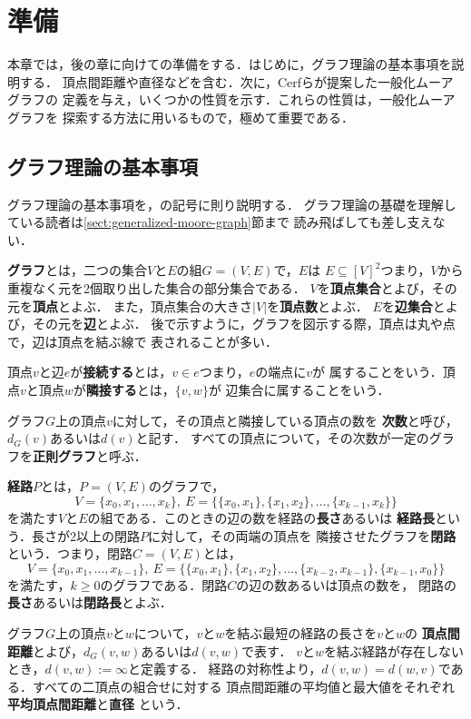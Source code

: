 
\chapter{準備}
\label{chap:preliminary}
本章では，後の章に向けての準備をする．はじめに，グラフ理論の基本事項を説明する．
頂点間距離や直径などを含む．次に，Cerfらが提案した一般化ムーアグラフの
定義を与え，いくつかの性質を示す．これらの性質は，一般化ムーアグラフを
探索する方法に用いるもので，極めて重要である．

\section{グラフ理論の基本事項}
\label{sect:basic-graph-theory}
グラフ理論の基本事項を，\cite{Diestel2000}の記号に則り説明する．
グラフ理論の基礎を理解している読者は\ref{sect:generalized-moore-graph}節まで
読み飛ばしても差し支えない．

\textbf{グラフ}とは，二つの集合$V$と$E$の組$G=(V,E)$で，$E$は
$E\subseteq[V]^2$つまり，$V$から重複なく元を2個取り出した集合の部分集合である．
$V$を\textbf{頂点集合}とよび，その元を\textbf{頂点}とよぶ．
また，頂点集合の大きさ$|V|$を\textbf{頂点数}とよぶ．
$E$を\textbf{辺集合}とよび，その元を\textbf{辺}とよぶ．
後で示すように，グラフを図示する際，頂点は丸や点で，辺は頂点を結ぶ線で
表されることが多い．

頂点$v$と辺$e$が\textbf{接続する}とは，$v\in e$つまり，$e$の端点に$v$が
属することをいう．頂点$v$と頂点$w$が\textbf{隣接する}とは，$\{v,w\}$が
辺集合に属することをいう．

グラフ$G$上の頂点$v$に対して，その頂点と隣接している頂点の数を
\textbf{次数}と呼び，$d_G(v)$あるいは$d(v)$と記す．
すべての頂点について，その次数が一定のグラフを\textbf{正則グラフ}と呼ぶ．

\textbf{経路}$P$とは，$P=(V,E)$のグラフで，
\[ V=\{x_0,x_1,\ldots,x_k\},\:
E=\{\{x_0,x_1\},\{x_1,x_2\},\ldots,\{x_{k-1},x_k\}\}\]
を満たす$V$と$E$の組である．このときの辺の数を経路の\textbf{長さ}あるいは
\textbf{経路長}という．長さが2以上の閉路$P$に対して，その両端の頂点を
隣接させたグラフを\textbf{閉路}という．つまり，閉路$C=(V,E)$とは，
\[ V=\{x_0,x_1,\ldots,x_{k-1}\},\:
E=\{\{x_0,x_1\},\{x_1,x_2\},\ldots,\{x_{k-2},x_{k-1}\},\{x_{k-1},x_0\}\}\]
を満たす，$k\geq0$のグラフである．閉路$C$の辺の数あるいは頂点の数を，
閉路の\textbf{長さ}あるいは\textbf{閉路長}とよぶ．

グラフ$G$上の頂点$v$と$w$について，$v$と$w$を結ぶ最短の経路の長さを$v$と$w$の
\textbf{頂点間距離}とよび，$d_G(v,w)$あるいは$d(v,w)$で表す．
$v$と$w$を結ぶ経路が存在しないとき，$d(v,w):=\infty$と定義する．
経路の対称性より，$d(v,w)=d(w,v)$である．すべての二頂点の組合せに対する
頂点間距離の平均値と最大値をそれぞれ\textbf{平均頂点間距離}と\textbf{直径}
という．

